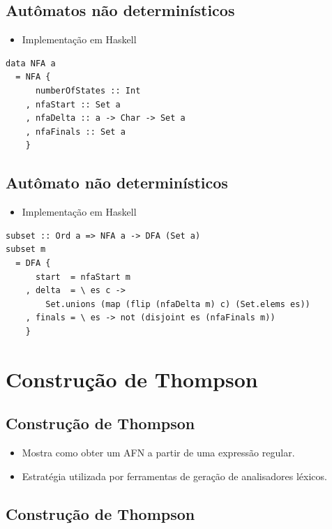 \documentclass[11pt]{article}
\begin{document}
\subsection*{Autômatos não determinísticos}
\label{sec:org9974da8}

\begin{itemize}
\item Implementação em Haskell
\end{itemize}

\begin{verbatim}
data NFA a
  = NFA {
      numberOfStates :: Int
    , nfaStart :: Set a
    , nfaDelta :: a -> Char -> Set a
    , nfaFinals :: Set a
    }
\end{verbatim}
\subsection*{Autômato não determinísticos}
\label{sec:org5292a16}

\begin{itemize}
\item Implementação em Haskell
\end{itemize}

\begin{verbatim}
subset :: Ord a => NFA a -> DFA (Set a)
subset m
  = DFA {
      start  = nfaStart m
    , delta  = \ es c ->
        Set.unions (map (flip (nfaDelta m) c) (Set.elems es))
    , finals = \ es -> not (disjoint es (nfaFinals m))
    }
\end{verbatim}
\section*{Construção de Thompson}
\label{sec:org8d48d12}

\subsection*{Construção de Thompson}
\label{sec:org95731ba}

\begin{itemize}
\item Mostra como obter um AFN a partir de uma expressão regular.

\item Estratégia utilizada por ferramentas de geração de analisadores léxicos.
\end{itemize}
\subsection*{Construção de Thompson}
\label{sec:org5fd2983}
\end{document}
